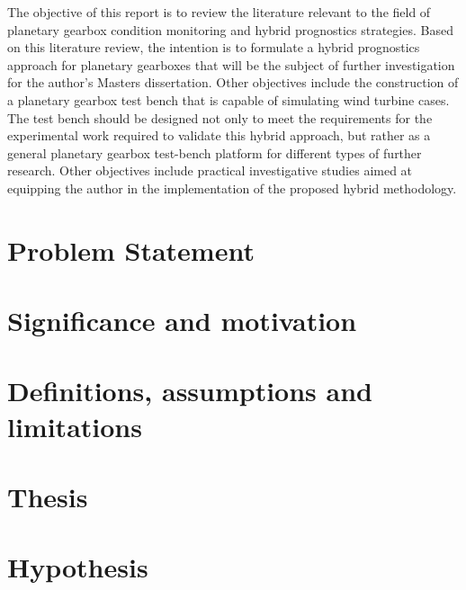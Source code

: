 The objective of this report is to review the literature relevant to the field of planetary gearbox condition monitoring and hybrid prognostics strategies. Based on this literature review, the intention is to formulate a hybrid prognostics approach for planetary gearboxes that will be the subject of further investigation for the author's Masters dissertation. Other objectives include the construction of a planetary gearbox test bench that is capable of simulating wind turbine cases. The test bench should be designed not only to meet the requirements for the experimental work required to validate this hybrid approach, but rather as a general planetary gearbox test-bench platform for different types of further research. Other objectives include practical investigative studies aimed at equipping the author in the implementation of the proposed hybrid methodology.


\section{Problem Statement}


\section{Significance and motivation}


\section{Definitions, assumptions and limitations}

\section{Thesis}

\section{Hypothesis}

